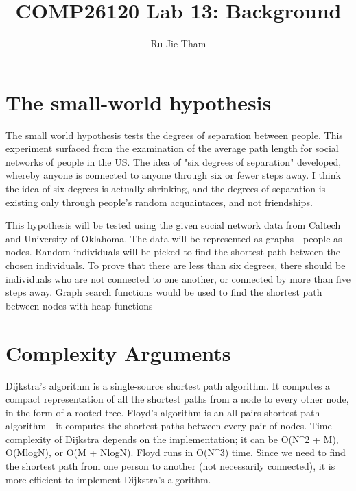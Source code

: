 \documentclass{article}
\title{COMP26120 Lab 13: Background}
\author{Ru Jie Tham}
\begin{document}
\maketitle


\section{The small-world hypothesis}
\label{sec:small world}
The small world hypothesis tests the degrees of separation between people. This experiment surfaced from the
examination of the average path length for social networks of people in the US. The idea of "six degrees of 
separation" developed, whereby anyone is connected to anyone through six or fewer steps away. I think the idea
of six degrees is actually shrinking, and the degrees of separation is existing only through people's random 
acquaintaces, and not friendships.

This hypothesis will be tested using the given social network data from Caltech and University of Oklahoma. The
data will be represented as graphs - people as nodes. Random individuals will be picked to find the shortest path
between the chosen individuals. To prove that there are less than six degrees, there should be individuals who are
not connected to one another, or connected by more than five steps away. Graph search functions would be used to
find the shortest path between nodes with heap functions 


\section{Complexity Arguments}
\label{sec:complexity}
Dijkstra's algorithm is a single-source shortest path algorithm. It computes a compact representation of all the
shortest paths from a node to every other node, in the form of a rooted tree. 
Floyd's algorithm is an all-pairs shortest path algorithm - it computes the shortest paths between every pair of
nodes. 
Time complexity of Dijkstra depends on the implementation; it can be O(N^2 + M), O(MlogN), or O(M + NlogN).
Floyd runs in O(N^3) time.
Since we need to find the shortest path from one person to another (not necessarily connected), it is more efficient to implement Dijkstra's
algorithm.
\end{document}
